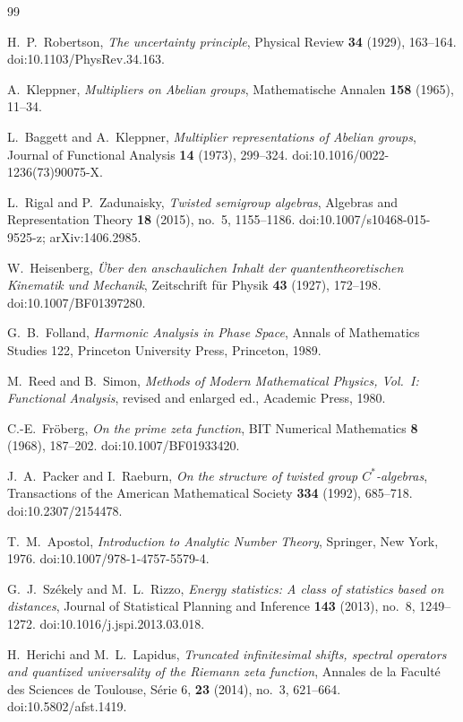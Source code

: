 \documentclass[11pt]{amsart}
\numberwithin{equation}{section}
\theoremstyle{plain}
\theoremstyle{definition}
\theoremstyle{remark}
\begin{document}
\begin{thebibliography}{99}

H.~P.~Robertson,
\emph{The uncertainty principle},
Physical Review \textbf{34} (1929), 163--164.
doi:10.1103/PhysRev.34.163.

A.~Kleppner,
\emph{Multipliers on Abelian groups},
Mathematische Annalen \textbf{158} (1965), 11--34.

L.~Baggett and A.~Kleppner,
\emph{Multiplier representations of Abelian groups},
Journal of Functional Analysis \textbf{14} (1973), 299--324.
doi:10.1016/0022-1236(73)90075-X.

L.~Rigal and P.~Zadunaisky,
\emph{Twisted semigroup algebras},
Algebras and Representation Theory \textbf{18} (2015), no.~5, 1155--1186.
doi:10.1007/s10468-015-9525-z; arXiv:1406.2985.

W.~Heisenberg,
\emph{\"Uber den anschaulichen Inhalt der quantentheoretischen Kinematik und
Mechanik},
Zeitschrift f\"ur Physik \textbf{43} (1927), 172--198.
doi:10.1007/BF01397280.

G.~B.~Folland,
\emph{Harmonic Analysis in Phase Space},
Annals of Mathematics Studies 122,
Princeton University Press, Princeton, 1989.

M.~Reed and B.~Simon,
\emph{Methods of Modern Mathematical Physics, Vol.~I: Functional Analysis},
revised and enlarged ed., Academic Press, 1980.


C.-E.~Fr\"oberg,
\emph{On the prime zeta function},
BIT Numerical Mathematics \textbf{8} (1968), 187--202.
doi:10.1007/BF01933420.

J.~A.~Packer and I.~Raeburn,
\emph{On the structure of twisted group $C^*$-algebras},
Transactions of the American Mathematical Society \textbf{334} (1992), 685--718.
doi:10.2307/2154478.

T.~M.~Apostol,
\emph{Introduction to Analytic Number Theory},
Springer, New York, 1976.
doi:10.1007/978-1-4757-5579-4.

G.~J.~Sz\'ekely and M.~L.~Rizzo,
\emph{Energy statistics: A class of statistics based on distances},
Journal of Statistical Planning and Inference \textbf{143} (2013), no.~8,
1249--1272.
doi:10.1016/j.jspi.2013.03.018.


H.~Herichi and M.~L.~Lapidus,
\emph{Truncated infinitesimal shifts, spectral operators and quantized
universality of the Riemann zeta function},
Annales de la Facult\'e des Sciences de Toulouse, S\'erie 6, \textbf{23}
(2014), no.~3, 621--664.
doi:10.5802/afst.1419.


\end{thebibliography}
\end{document}
